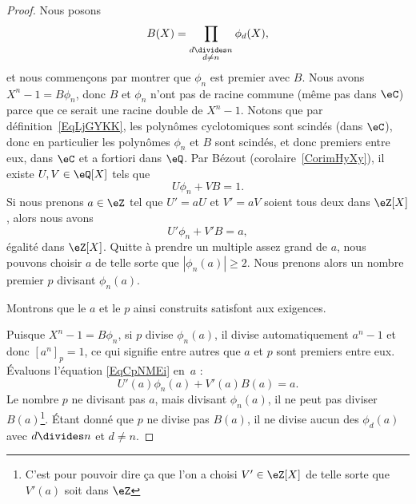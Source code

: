 \begin{proof}
	Nous posons
	\begin{equation}
		B(X)=\prod_{_{\substack{d\divides n\\d\neq n}}}\phi_d(X),
	\end{equation}
	et nous commençons par montrer que \( \phi_n\) est premier avec \( B\). Nous avons \( X^n-1=B\phi_n\), donc \( B\) et \( \phi_n\) n'ont pas de racine commune (même pas dans \( \eC\)) parce que ce serait une racine double de \( X^n-1\). Notons que par définition~\ref{EqLjGYKK}, les polynômes cyclotomiques sont scindés (dans \( \eC\)), donc en particulier les polynômes \( \phi_n\) et \( B\) sont scindés, et donc premiers entre eux, dans \( \eC\) et a fortiori dans \( \eQ\). Par Bézout (corolaire~\ref{CorimHyXy}), il existe \( U,V\in\eQ[X]\) tels que
	\begin{equation}
		U\phi_n+VB=1.
	\end{equation}
	Si nous prenons \( a\in \eZ\) tel que \( U'=aU\) et \( V'=aV\) soient tous deux dans \( \eZ[X]\), alors nous avons
	\begin{equation}    \label{EqCpNMEi}
		U'\phi_n+V'B=a,
	\end{equation}
	égalité dans \( \eZ[X]\). Quitte à prendre un multiple assez grand de \( a\), nous pouvons choisir \( a\) de telle sorte que \( | \phi_n(a) |\geq 2\). Nous prenons alors un nombre premier \( p\) divisant \( \phi_n(a)\).

	Montrons que le \( a\) et le \( p\) ainsi construits satisfont aux exigences.

	Puisque \( X^n-1=B\phi_n\), si \( p\) divise \( \phi_n(a)\), il divise automatiquement \( a^n-1\) et donc \( [a^n]_p=1\), ce qui signifie entre autres que \( a\) et \( p\) sont premiers entre eux. Évaluons l'équation \eqref{EqCpNMEi} en~\( a\) :
	\begin{equation}
		U'(a)\phi_n(a)+V'(a)B(a)=a.
	\end{equation}
	Le nombre \( p\) ne divisant pas \( a\), mais divisant \( \phi_n(a)\), il ne peut pas diviser \( B(a)\)\footnote{C'est pour pouvoir dire ça que l'on a choisi \( V'\in \eZ[X]\) de telle sorte que \( V'(a)\) soit dans \( \eZ\)}. Étant donné que \( p\) ne divise pas \( B(a)\), il ne divise aucun des \( \phi_d(a)\) avec \( d\divides n\) et \( d\neq n\).


\end{proof}
